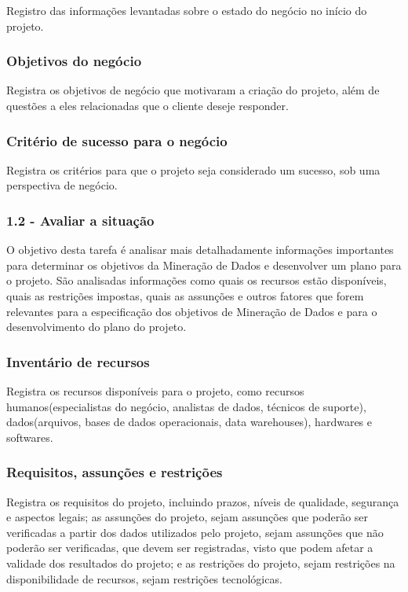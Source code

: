 Registro das informações levantadas sobre o estado do negócio no início do projeto.

\subsubsection*{Objetivos do negócio}

Registra os objetivos de negócio que motivaram a criação do projeto, além de questões a eles relacionadas que o cliente deseje responder. 

\subsubsection*{Critério de sucesso para o negócio}

Registra os critérios para que o projeto seja considerado um sucesso, sob uma perspectiva de negócio.

\subsubsection*{\textbf{1.2 - Avaliar a situação}}

O objetivo desta tarefa é analisar mais detalhadamente informações importantes para determinar os objetivos da Mineração de Dados e desenvolver um plano para o projeto. São analisadas informações como quais os recursos estão disponíveis, quais as restrições impostas, quais as assunções e outros fatores que forem relevantes para a especificação dos objetivos de Mineração de Dados e para o desenvolvimento do plano do projeto.

\subsubsection*{Inventário de recursos}

Registra os recursos disponíveis para o projeto, como recursos humanos(especialistas do negócio, analistas de dados, técnicos de suporte), dados(arquivos, bases de dados operacionais, data warehouses), hardwares e softwares.

\subsubsection*{Requisitos, assunções e restrições}

Registra os requisitos do projeto, incluindo prazos, níveis de qualidade, segurança e aspectos legais; as assunções do projeto, sejam assunções que poderão ser verificadas a partir dos dados utilizados pelo projeto, sejam assunções que não poderão ser verificadas, que devem ser registradas, visto que podem afetar a validade dos resultados do projeto; e as restrições do projeto, sejam restrições na disponibilidade de recursos, sejam restrições tecnológicas.

